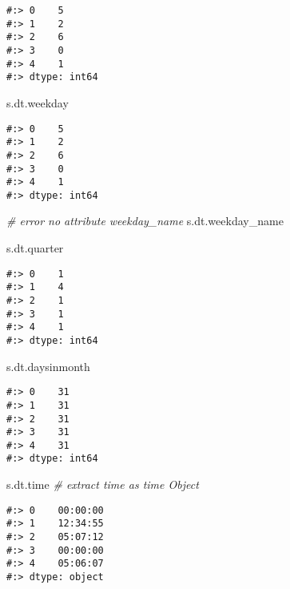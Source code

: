 \documentclass[
]{book}
\newenvironment{Shaded}{\begin{snugshade}}{\end{snugshade}}
\newcommand{\CommentTok}[1]{\textcolor[rgb]{0.37,0.37,0.37}{\textit{#1}}}
\newcommand{\NormalTok}[1]{#1}
\begin{document}
\begin{verbatim}
#:> 0    5
#:> 1    2
#:> 2    6
#:> 3    0
#:> 4    1
#:> dtype: int64
\end{verbatim}

\begin{Shaded}
\begin{Highlighting}[]
\NormalTok{s.dt.weekday}
\end{Highlighting}
\end{Shaded}

\begin{verbatim}
#:> 0    5
#:> 1    2
#:> 2    6
#:> 3    0
#:> 4    1
#:> dtype: int64
\end{verbatim}

\begin{Shaded}
\begin{Highlighting}[]
\CommentTok{\# error no attribute weekday\_name}
\NormalTok{s.dt.weekday\_name}
\end{Highlighting}
\end{Shaded}

\begin{Shaded}
\begin{Highlighting}[]
\NormalTok{s.dt.quarter}
\end{Highlighting}
\end{Shaded}

\begin{verbatim}
#:> 0    1
#:> 1    4
#:> 2    1
#:> 3    1
#:> 4    1
#:> dtype: int64
\end{verbatim}

\begin{Shaded}
\begin{Highlighting}[]
\NormalTok{s.dt.daysinmonth}
\end{Highlighting}
\end{Shaded}

\begin{verbatim}
#:> 0    31
#:> 1    31
#:> 2    31
#:> 3    31
#:> 4    31
#:> dtype: int64
\end{verbatim}

\begin{Shaded}
\begin{Highlighting}[]
\NormalTok{s.dt.time   }\CommentTok{\# extract time as time Object}
\end{Highlighting}
\end{Shaded}

\begin{verbatim}
#:> 0    00:00:00
#:> 1    12:34:55
#:> 2    05:07:12
#:> 3    00:00:00
#:> 4    05:06:07
#:> dtype: object
\end{verbatim}
\end{document}
